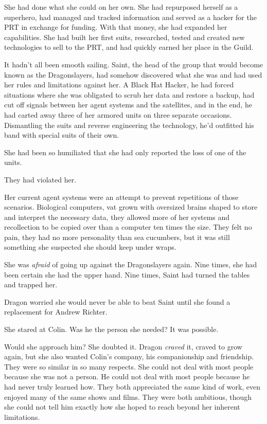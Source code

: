 She had done what she could on her own.  She had repurposed herself as a superhero, had managed and tracked information and served as a hacker for the PRT in exchange for funding.  With that money, she had expanded her capabilities.  She had built her first suits, researched, tested and created new technologies to sell to the PRT, and had quickly earned her place in the Guild.



It hadn't all been smooth sailing.  Saint, the head of the group that would become known as the Dragonslayers, had somehow discovered what she was and had used her rules and limitations against her.  A Black Hat Hacker, he had forced situations where she was obligated to scrub her data and restore a backup, had cut off signals between her agent systems and the satellites, and in the end, he had carted away three of her armored units on three separate occasions.  Dismantling the suits and reverse engineering the technology, he'd outfitted his band with special suits of their own.



She had been so humiliated that she had only reported the loss of one of the units.



They had violated her.



Her current agent systems were an attempt to prevent repetitions of those scenarios.  Biological computers, vat grown with oversized brains shaped to store and interpret the necessary data, they allowed more of her systems and recollection to be copied over than a computer ten times the size.  They felt no pain, they had no more personality than sea cucumbers, but it was still something she suspected she should keep under wraps.



She was \emph{afraid} of going up against the Dragonslayers again.  Nine times, she had been certain she had the upper hand.  Nine times, Saint had turned the tables and trapped her.



Dragon worried she would never be able to beat Saint until she found a replacement for Andrew Richter.



She stared at Colin.  Was he the person she needed?  It was possible.



Would she approach him?  She doubted it.  Dragon \emph{craved} it, craved to grow again, but she also wanted Colin's company, his companionship and friendship.  They were so similar in so many respects.  She could not deal with most people because she was not a person.  He could not deal with most people because he had never truly learned how.  They both appreciated the same kind of work, even enjoyed many of the same shows and films.  They were both ambitious, though she could not tell him exactly how she hoped to reach beyond her inherent limitations.



